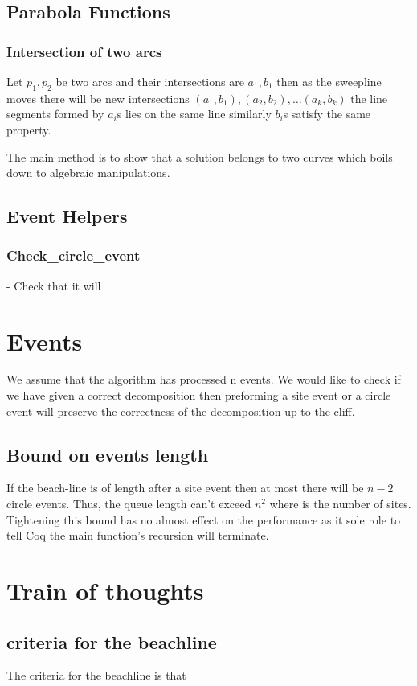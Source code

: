 \documentclass{article}
\begin{document}
\subsection{Parabola Functions}
\subsubsection{Intersection of two arcs}
Let $p_1, p_2$ be two arcs and their intersections are $a_1, b_1$ then as the sweepline moves there will be new intersections $\left(a_1, b_1\right),\left(a_2, b_2\right),\dots \left(a_k, b_k\right)$ the line segments formed by $a_i$s lies on the same line similarly  $b_i$s satisfy the same property.

The main method is to show that a solution belongs to two curves which boils down to algebraic manipulations.

\subsection{Event Helpers}
\subsubsection{Check\_circle\_event}
- Check that it will 

\section{Events}
We assume that the algorithm has processed n events. We would like to check if we have given a correct decomposition then preforming a site event or a circle event will preserve the correctness of the decomposition up to the cliff.

\subsection{Bound on events length} If the beach-line is of length after a site event then at most there will be $n-2$ circle events. Thus, the queue length can't exceed $n^2$ where is the number of sites. Tightening this bound has no almost effect on the performance as it sole role to tell Coq the main function's recursion will terminate.

\section{Train of thoughts}
\subsection{criteria for the beachline}
The criteria for the beachline is that 
\end{document}
